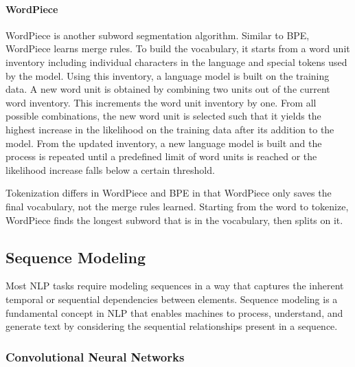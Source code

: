 \paragraph{WordPiece}

WordPiece \citep{wu2016google} is another subword segmentation algorithm. Similar to \ac{BPE}, WordPiece learns merge rules. To build the vocabulary, it starts from a word unit inventory including individual characters in the language and special tokens used by the model. Using this inventory, a language model is built on the training data. A new word unit is obtained by combining two units out of the current word inventory. This increments the word unit inventory by one. From all possible combinations, the new word unit is selected such that it yields the highest increase in the likelihood on the training data after its addition to the model. From the updated inventory, a new language model is built and the process is repeated until a predefined limit of word units is reached or the likelihood increase falls below a certain threshold. 

Tokenization differs in WordPiece and \ac{BPE} in that WordPiece only saves the final vocabulary, not the merge rules learned. Starting from the word to tokenize, WordPiece finds the longest subword that is in the vocabulary, then splits on it. 


\subsection{Sequence Modeling}

Most \ac{NLP} tasks require modeling sequences in a way that captures the inherent temporal or sequential dependencies between elements. Sequence modeling is a fundamental concept in NLP that enables machines to process, understand, and generate text by considering the sequential relationships present in a sequence.

\subsubsection{Convolutional Neural Networks}

